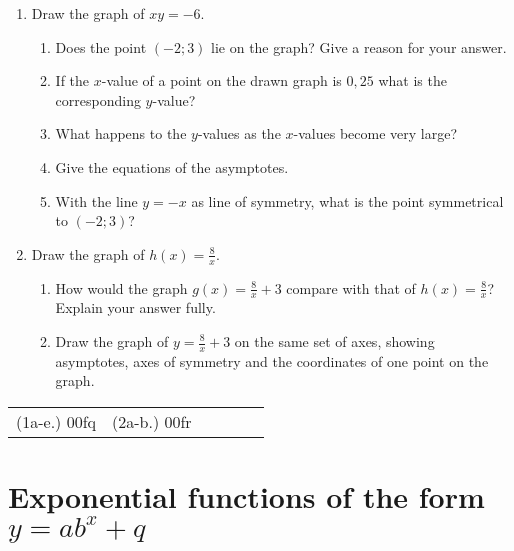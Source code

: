 \begin{exercises}{}{
\begin{enumerate}[noitemsep, label=\textbf{\arabic*}. ] 
\item Draw the graph of $xy=-6$.
  \begin{enumerate}[noitemsep, label=\textbf{(\alph*)} ] 
  \item Does the point $(-2; 3)$ lie on the graph? Give a reason for your answer.
  \item If the $x$-value of a point on the drawn graph is $0,25$ what is the corresponding $y$-value?
  \item What happens to the $y$-values as the $x$-values become very large?
  \item Give the equations of the asymptotes.
  \item With the line $y=-x$ as line of symmetry, what is the point symmetrical to $(-2; 3)$?
  \end{enumerate}
\item Draw the graph of $h(x)=\frac{8}{x}$.
  \begin{enumerate}[noitemsep, label=\textbf{(\alph*)} ] 
  \item How would the graph $g(x)=\frac{8}{x}+3$ compare with that of $h(x)=\frac{8}{x}$? Explain your answer fully.
  \item Draw the graph of $y=\frac{8}{x}+3$ on the same set of axes, showing asymptotes, axes of symmetry and the coordinates of one point on the graph.
  \end{enumerate}
\end{enumerate}
\practiceinfo
\par 
\par \begin{tabular}[h]{cccccc}
(1a-e.) 00fq&  (2a-b.) 00fr& \end{tabular}
}
\end{exercises}

\section{Exponential functions of the form $y=ab^{x}+q$}


